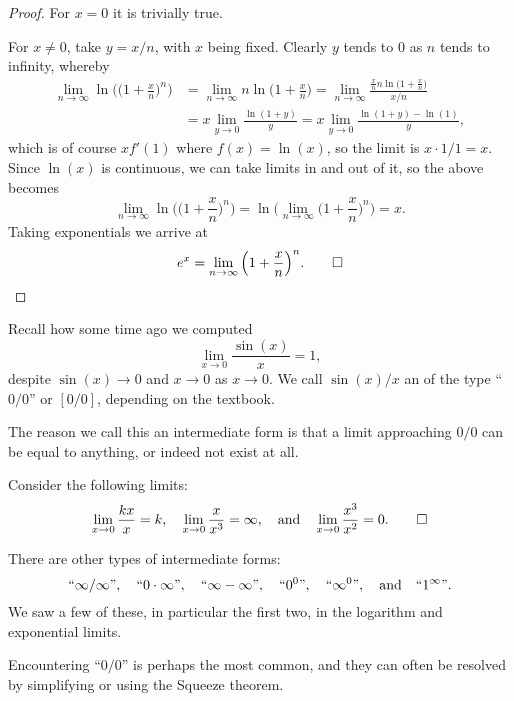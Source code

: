\begin{proof}
	For $x = 0$ it is trivially true.

	For $x \neq 0$, take $y = x / n$, with $x$ being fixed. Clearly $y$ tends to $0$ as $n$ tends to infinity, whereby
	\begin{align*}
		\lim_{n \to \infty} \ln \Big ( \Big ( 1 + \frac{x}{n} \Big )^n \Big ) & = \lim_{n \to \infty} n \ln\Big ( 1 + \frac{x}{n} \Big ) = \lim_{n \to \infty} \frac{\frac{x}{n} n \ln \big ( 1 + \frac{x}{n} \big )}{x / n} \\
		                                                                      & = x \lim_{y \to 0} \frac{\ln(1 + y)}{y} = x \lim_{y \to 0} \frac{\ln(1 + y) - \ln(1)}{y},
	\end{align*}
	which is of course $x f'(1)$ where $f(x) = \ln(x)$, so the limit is $x \cdot 1/1 = x$. Since $\ln(x)$ is continuous, we can take limits in and out of it, so the above becomes
	\[
		\lim_{n \to \infty} \ln \Big ( \Big ( 1 + \frac{x}{n} \Big )^n \Big ) = \ln \Big ( \lim_{n \to \infty} \Big ( 1 + \frac{x}{n} \Big )^n \Big ) = x.
	\]
	Taking exponentials we arrive at
	\[
		e^x = \lim_{n \to \infty} \Big ( 1 + \frac{x}{n} \Big )^n. \qedhere
	\]
\end{proof}


Recall how some time ago we computed
\[
	\lim_{x \to 0} \frac{\sin(x)}{x} = 1,
\]
despite $\sin(x) \to 0$ and $x \to 0$ as $x \to 0$. We call $\sin(x) / x$ an  of the type ``$0 / 0$'' or $[0 / 0]$, depending on the textbook.

The reason we call this an intermediate form is that a limit approaching $0 / 0$ can be equal to anything, or indeed not exist at all.

\begin{examples}
	Consider the following limits:
	\[
		\lim_{x \to 0} \frac{k x}{x} = k, \quad \lim_{x \to 0} \frac{x}{x^3} = \infty, \quad \text{and} \quad \lim_{x \to 0} \frac{x^3}{x^2} = 0. \qedhere
	\]
\end{examples}

\noindent
There are other types of intermediate forms:
\[
	``\infty / \infty ", \quad ``0 \cdot \infty", \quad ``\infty - \infty", \quad ``0^0", \quad ``\infty^0", \quad \text{and} \quad ``1^\infty".
\]
We saw a few of these, in particular the first two, in the logarithm and exponential limits.

Encountering ``$0 / 0$'' is perhaps the most common, and they can often be resolved by simplifying or using the Squeeze theorem.


